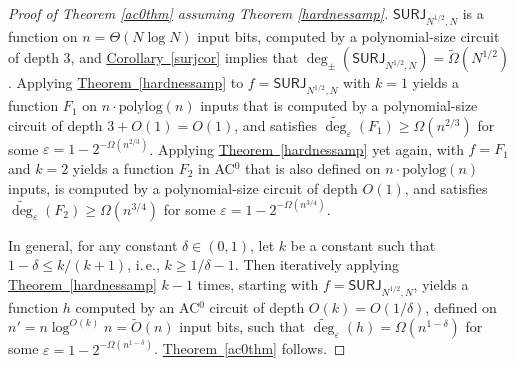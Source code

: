 \documentclass[11pt]{article}
\numberwithin{equation}{section}
\theoremstyle{definition}
\theoremstyle{plain}
\newcommand{\ie}{i.\,e.}
\newcommand{\expref}[2]{\hyperref[#2]{#1~\ref{#2}}}
\newcommand{\polylog}{\mathrm{polylog}}
\newcommand{\SURJ}{\mathsf{ SURJ}}
\newcommand{\eps}{\varepsilon}
\newcommand{\adeg}{\widetilde{\operatorname{deg}}}
\begin{document}
\begin{proof}[Proof of Theorem \ref{ac0thm} assuming Theorem \ref{hardnessamp}]
$\SURJ_{N^{1/2}, N}$ is a function on $n=\Theta(N \log N)$ input bits,
%
computed by a polynomial-size %
circuit of depth 3, and 
	\expref{Corollary}{surjcor} implies that $\deg_{\pm}(\SURJ_{N^{1/2}, N}) = \tilde{\Omega}(N^{1/2})$.
	Applying \expref{Theorem}{hardnessamp} to $f=\SURJ_{N^{1/2}, N}$ with $k=1$ yields a function $F_1$ 
	on $n \cdot \polylog(n)$ inputs that is computed by a 
polynomial-size %
circuit of depth $3+O(1)=O(1)$, and satisfies $\adeg_{\eps}(F_1) \geq \Omega(n^{2/3})$
	for some $\eps=1-2^{-\Omega(n^{2/3})}$.
	Applying \expref{Theorem}{hardnessamp} yet again, with $f=F_1$ and $k=2$
	yields a function $F_2$ in AC$^0$ that is also defined on $n \cdot \polylog(n)$ inputs, is computed
by a polynomial-size %
circuit of depth $O(1)$, and satisfies 
	$\adeg_{\eps}(F_2) \geq \Omega(n^{3/4})$
	for some $\eps=1-2^{-\Omega(n^{3/4})}$. %
	
	In general, for any constant $\delta \in (0, 1)$, let $k$ be a constant such that $1-\delta \le k/(k+1)$,
	\ie, $k \ge 1/\delta-1$. 
	Then iteratively applying \expref{Theorem}{hardnessamp} $k-1$ times, starting with $f=\SURJ_{N^{1/2}, N}$,
	yields a function $h$ computed by an AC$^0$ circuit of depth $O(k)=O(1/\delta)$, defined on $n' = n \log^{O(k)} n = \tilde{O}(n)$ input bits,
	such that $\adeg_{\eps}(h) = \Omega(n^{1-\delta})$
	for some $\eps=1-2^{-\Omega(n^{1-\delta})}$. \expref{Theorem}{ac0thm} follows.
\end{proof}
\end{document}
